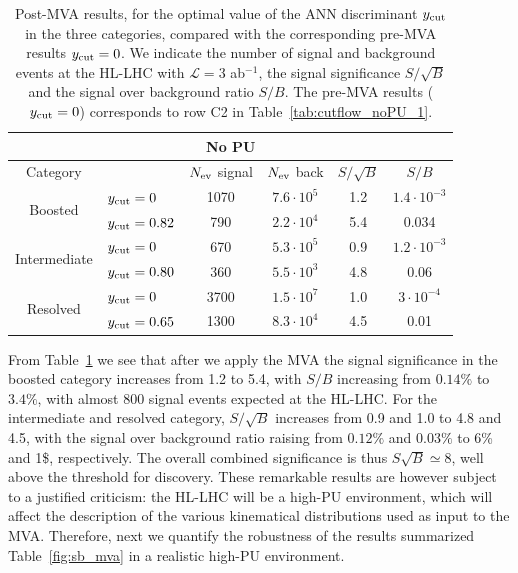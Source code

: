\begin{table}[t]
  \centering
  \begin{tabular}{|c|l|c|c|c|c|}
    \hline
    \multicolumn{6}{|c|}{No PU} \\
    \hline
    \hline
    Category  &   &  $N_{\rm ev}$ signal &  $N_{\rm ev}$ back  &  $S/\sqrt{B}$ & $S/B$ \\ 
    \hline
    \hline
    \multirow{2}{*}{Boosted} &  $y_{\rm cut}=0$  & 1070 & $7.6\cdot 10^5$  & 1.2  & $1.4\cdot 10^{-3}$  \\
    &  $y_{\rm cut}=0.82$ & 790  & $2.2\cdot 10^4$   & 5.4  & 0.034 \\
    \hline
    \hline
    \multirow{2}{*}{Intermediate} &  $y_{\rm cut}=0$  & 670   & $5.3\cdot 10^5$
    & 0.9 & $1.2\cdot 10^{-3}$ \\
    &  $y_{\rm cut}=0.80$ & 360  & $5.5\cdot 10^3$  & 4.8 & 0.06\\
    \hline
    \hline
      \multirow{2}{*}{Resolved} &  $y_{\rm cut}=0$  & 3700 &  $1.5\cdot 10^{7}$ &  1.0 &$3\cdot 10^{-4}$ \\
    &  $y_{\rm cut}=0.65$ & 1300  & $8.3\cdot 10^{4}$ & 4.5 & 0.01 \\
    \hline
      \end{tabular}
  \caption{\small Post-MVA results, for the optimal value of the
    ANN discriminant $y_{\rm cut}$ in the three categories, compared with the
    corresponding
    pre-MVA results $y_{\rm cut}=0$.
    We indicate the number of signal and
    background events
    at the HL-LHC with $\mathcal{L}=3$ ab$^{-1}$,
    the signal significance $S/\sqrt{B}$ and
    the signal over background ratio $S/B$.
    The pre-MVA results ($y_{\rm cut}=0$) corresponds to row C2 in
    Table~\ref{tab:cutflow_noPU_1}.
    \label{table:cutflowMVA}
  }
\end{table}




From Table~\ref{table:cutflowMVA} we see that
after we apply the MVA
the signal significance in the boosted category increases
from 1.2 to 5.4, with $S/B$ increasing from $0.14\%$ to $3.4\%$,
with almost 800 signal events expected at the HL-LHC.
%
For the intermediate and resolved category, $S/\sqrt{B}$
increases from 0.9 and 1.0 to 4.8 and 4.5, with
the signal over background ratio raising from
$0.12\%$ and $0.03\%$ to 6\% and 1\$, respectively.
%
The overall combined significance is thus $S\sqrt{B}\simeq 8$,
well above the threshold for discovery.
%
These remarkable results are however subject to a justified
criticism:
the HL-LHC will be a high-PU environment,
which will affect the description of the various
kinematical distributions used as input to the MVA.
%
Therefore, next we quantify the robustness of the
results summarized Table~\ref{fig:sb_mva}
in a realistic high-PU environment.

